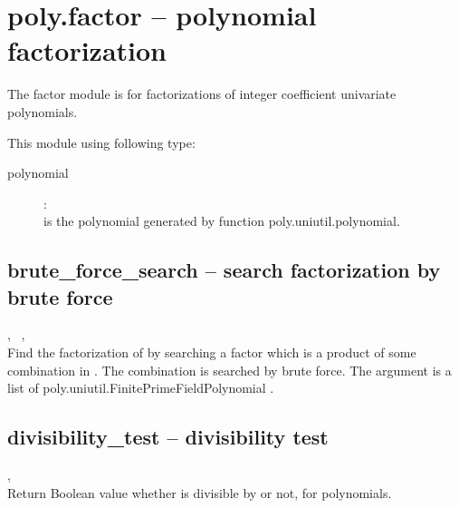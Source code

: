 

 \section{poly.factor -- polynomial factorization}
 The factor module is for factorizations of integer coefficient univariate polynomials.


 This module using following type:
 \begin{description}
   \item[polynomial]:\\
      is the polynomial generated by function poly.uniutil.polynomial. 
 \end{description}

%
  \subsection{brute\_force\_search -- search factorization by brute force}
   {%
     ,\ %
     ,\ %
   }{%
     \out{[factors]}%
   }\\
   \spacing
   \quad Find the factorization of  by searching a factor which is a product of some combination in . The combination is searched by brute force.
   \spacing
   The argument  is a list of poly.uniutil.FinitePrimeFieldPolynomial .
   \spacing
%
  \subsection{divisibility\_test -- divisibility test}
        {,\ %
        }
        {}\\
   \spacing
   \quad Return Boolean value whether  is divisible by  or not, for polynomials.
   \spacing
%
